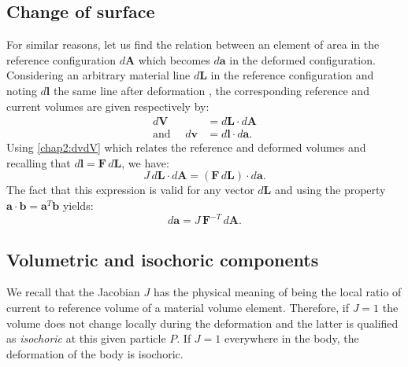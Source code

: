 	\subsection{Change of surface}
For similar reasons, let us find the relation between an element of area in the reference configuration $d\mathbf{A}$ which becomes $d\mathbf{a}$ in the deformed configuration. Considering an arbitrary material line $d\mathbf{L}$ in the reference configuration and noting $d\mathbf{l}$ the same line after deformation , the corresponding reference and current volumes are given respectively by:
\begin{align}
d\mathbf{V} &= d\mathbf{L} \cdot d\mathbf{A} \\
\mbox{and } \quad d\mathbf{v} &= d\mathbf{l} \cdot d\mathbf{a}.
\end{align}
Using \eqref{chap2:dvdV} which relates the reference and deformed volumes and recalling that $d\mathbf{l} = \mathbf{F} \, d\mathbf{L}$, we have:
\begin{equation}
J \, d\mathbf{L} \cdot d\mathbf{A} = (\mathbf{F} \, d\mathbf{L}) \cdot d\mathbf{a}.
\end{equation}
The fact that this expression is valid for any vector $d\mathbf{L}$ and using the property $\mathbf{a} \cdot \mathbf{b} = \mathbf{a} ^{T} \mathbf{b}$ yields:
\begin{equation}
\label{chap2:dadA}
d\mathbf{a} = J \, \mathbf{F}^{-T} \, d\mathbf{A}.
\end{equation}
			
			
	\subsection{Volumetric and isochoric components}
We recall that the Jacobian $J$ has the physical meaning of being the local ratio of current to reference volume of a material volume element. Therefore, if $J = 1$ the volume does not change locally during the deformation and the latter is qualified as \emph{isochoric} at this given particle $P$. If $J = 1$ everywhere in the body, the deformation of the body is isochoric. 

